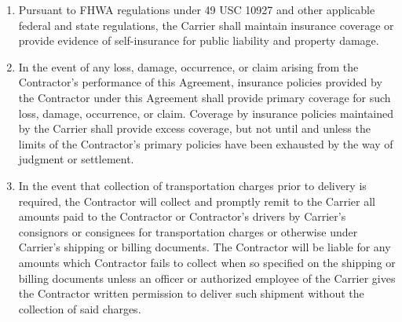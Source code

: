 \begin{enumerate}[
    ref = \SecondLevelEnumerator
]
\begin{enumerate}[
        ref = \ThirdLevelEnumerator
    ]
        \item The Contractor agrees to provide the Carrier written notice,
        within 24 hours, of cancellation or reduction of limits of
        insurance identified herein. Any such cancellation or reduction
        shall not affect the obligations of the Contractor to maintain such
        insurance.
    \end{enumerate}

    \item Pursuant to FHWA regulations under 49 USC 10927 and other
    applicable federal and state regulations, the Carrier shall maintain
    insurance coverage or provide evidence of self-insurance for public
    liability and property damage.

    \item In the event of any loss, damage, occurrence, or claim arising
    from the Contractor's performance of this Agreement, insurance policies
    provided by the Contractor under this Agreement shall provide primary
    coverage for such loss, damage, occurrence, or claim. Coverage by
    insurance policies maintained by the Carrier shall provide excess
    coverage, but not until and unless the limits of the Contractor's
    primary policies have been exhausted by the way of judgment or
    settlement.

    \item In the event that collection of transportation charges prior to
    delivery is required, the Contractor will collect and promptly remit to
    the Carrier all amounts paid to the Contractor or Contractor's drivers
    by Carrier's consignors or consignees for transportation charges or
    otherwise under Carrier's shipping or billing documents. The Contractor
    will be liable for any amounts which Contractor fails to collect when
    so specified on the shipping or billing documents unless an officer or
    authorized employee of the Carrier gives the Contractor written
    permission to deliver such shipment without the collection of said
    charges.
\end{enumerate}